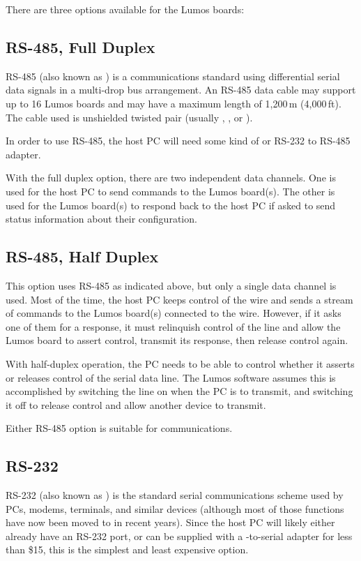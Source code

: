 \documentclass[letterpaper,twoside,onecolumn,openright,final]{memoir}
\begin{document}
There are three options available for the Lumos boards:

\subsection{RS-485, Full Duplex}
RS-485 (also known as ) is a communications standard using differential
serial data signals in a multi-drop bus arrangement.  An RS-485 data cable may support up to 16
Lumos boards and may have a maximum length of 1,200\,m (4,000\,ft).  The cable used is unshielded
twisted pair (usually , , or ).  

In order to use RS-485, the host PC will need some kind of  or RS-232 to RS-485 adapter.

With the full duplex option, there are two independent data channels.  One is used for the host PC
to send commands to the Lumos board(s).  The other is used for the Lumos board(s) to respond back to
the host PC if asked to send status information about their configuration.


\subsection{RS-485, Half Duplex}
This option uses RS-485 as indicated above, but only a single data channel is used.  Most of the time,
the host PC keeps control of the wire and sends a stream of commands to the Lumos board(s) connected
to the wire.  However, if it asks one of them for a response, it must relinquish control of the line
and allow the Lumos board to assert control, transmit its response, then release control again.

With half-duplex operation, the PC needs to be able to control whether it asserts or releases control
of the serial data line.  The Lumos software assumes this is accomplished by switching the  
line on when the PC is to transmit, and switching it off to release control and allow another device to
transmit.

Either RS-485 option is suitable for  communications.

\subsection{RS-232}
RS-232 (also known as ) is the standard serial communications scheme used by
PCs, modems, terminals, and similar devices (although most of those functions have now been moved
to  in recent years).  Since the host PC will likely either already have an RS-232
port, or can be supplied with a -to-serial adapter for less than \$15, this is the
simplest and least expensive option.
\end{document}
